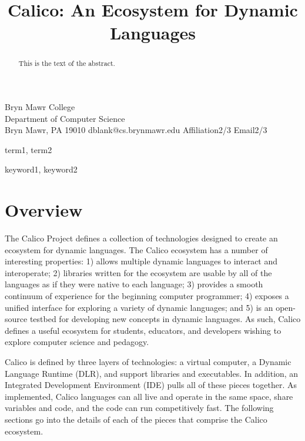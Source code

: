 \documentclass[preprint]{sigplanconf}
\begin{document}




\title{Calico: An Ecosystem for Dynamic Languages}


           {Bryn Mawr College\\Department of Computer Science\\Bryn Mawr, PA 19010}
           {dblank@cs.brynmawr.edu}
           {Affiliation2/3}
           {Email2/3}

\maketitle

\begin{abstract}
This is the text of the abstract.
\end{abstract}


\terms
term1, term2

\keywords
keyword1, keyword2

\section{Overview}

The Calico Project defines a collection of technologies designed to
create an ecosystem for dynamic languages. The Calico ecosystem has a
number of interesting properties: 1) allows multiple dynamic languages
to interact and interoperate; 2) libraries written for the ecosystem
are usable by all of the languages as if they were native to each
language; 3) provides a smooth continuum of experience for the
beginning computer programmer; 4) exposes a unified interface for
exploring a variety of dynamic languages; and 5) is an open-source
testbed for developing new concepts in dynamic languages. As such,
Calico defines a useful ecosystem for students, educators, and
developers wishing to explore computer science and pedagogy.

Calico is defined by three layers of technologies: a virtual computer,
a Dynamic Language Runtime (DLR), and support libraries and
executables. In addition, an Integrated Development Environment (IDE)
pulls all of these pieces together. As implemented, Calico languages
can all live and operate in the same space, share variables and code,
and the code can run competitively fast. The following sections go
into the details of each of the pieces that comprise the Calico
ecosystem.
\end{document}
